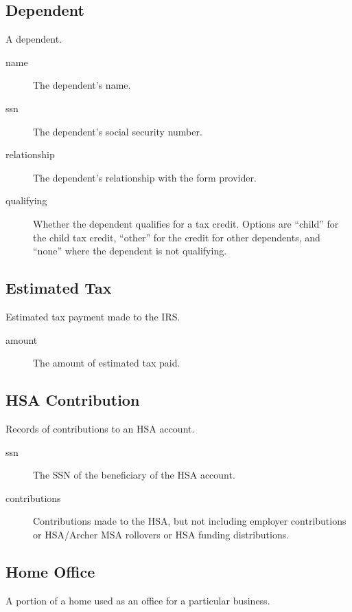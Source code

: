 \documentclass[12pt]{article}
\begin{document}
\subsection{Dependent}

A dependent.

\begin{description}
\item[name] The dependent's name.
\item[ssn] The dependent's social security number.
\item[relationship] The dependent's relationship with the form provider.
\item[qualifying] Whether the dependent qualifies for a tax credit. Options are
``child'' for the child tax credit, ``other'' for the credit for other
dependents, and ``none'' where the dependent is not qualifying.
\end{description}


\subsection{Estimated Tax}

Estimated tax payment made to the IRS.

\begin{description}
\item[amount] The amount of estimated tax paid.
\end{description}

\subsection{HSA Contribution}

Records of contributions to an HSA account.

\begin{description}
\item[ssn] The SSN of the beneficiary of the HSA account.
\item[contributions] Contributions made to the HSA, but not including employer
contributions or HSA/Archer MSA rollovers or HSA funding distributions.
\end{description}

\subsection{Home Office}

A portion of a home used as an office for a particular business.
\end{document}
